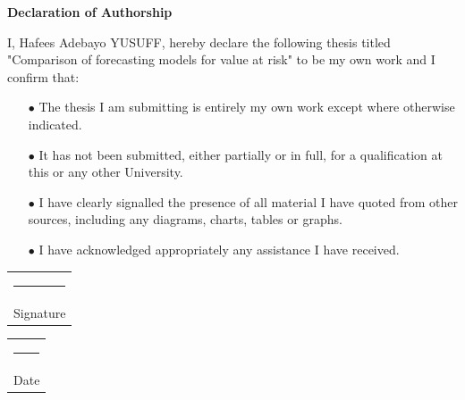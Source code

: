 \thispagestyle{empty}

\newpage\null\thispagestyle{empty}\newpage


\begin{titlepage}
	\textbf{\LARGE Declaration of Authorship}\newline\newline
	

		
		I, Hafees Adebayo YUSUFF, hereby declare the following thesis titled "Comparison of forecasting models for value at risk" to be my own work and I confirm that:
			\begin{itemize}
		\item[$\bullet$] The thesis I am submitting is entirely my own work except where otherwise indicated.
		
		\item[$\bullet$] It has not been submitted, either partially or in full, for a qualification at this or any other University.
	
	\item[$\bullet$] I have clearly signalled the presence of all material I have quoted from other sources,
	including any diagrams, charts, tables or graphs.
	
	\item[$\bullet$] I have acknowledged appropriately any assistance I have received.
	
	\end{itemize}
	
	\vspace*{4em}\noindent
	\hfill%
	\begin{tabular}[t]{c}
		\rule{10em}{0.4pt}\\ Signature
	\end{tabular}%
	\hfill%
	\begin{tabular}[t]{c}
		\rule{10em}{0.4pt}\\ Date
	\end{tabular}%
	\hfill\strut


\end{titlepage}
